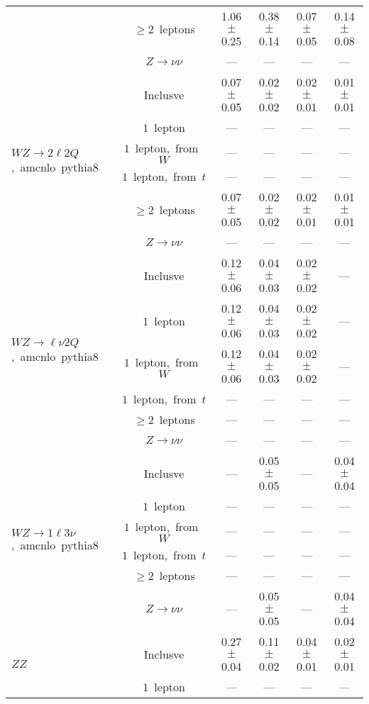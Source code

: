 \documentclass{article}
\begin{document}
\begin{longtable}{|l|c|c|c|c|c|}
 & $\ge2$~leptons  & 1.06 $\pm$ 0.25  & 0.38 $\pm$ 0.14  & 0.07 $\pm$ 0.05  & 0.14 $\pm$ 0.08 \\* 
 & $Z\rightarrow\nu\nu$  & ---  & ---  & ---  & --- \\* 
\hline 
\multirow{6}{*}{$WZ{\rightarrow}2{\ell}2Q$,~amcnlo~pythia8} & Inclusve  & 0.07 $\pm$ 0.05  & 0.02 $\pm$ 0.02  & 0.02 $\pm$ 0.01  & 0.01 $\pm$ 0.01 \\* 
 & $1$~lepton  & ---  & ---  & ---  & --- \\* 
 & $1$~lepton,~from~$W$  & ---  & ---  & ---  & --- \\* 
 & $1$~lepton,~from~$t$  & ---  & ---  & ---  & --- \\* 
 & $\ge2$~leptons  & 0.07 $\pm$ 0.05  & 0.02 $\pm$ 0.02  & 0.02 $\pm$ 0.01  & 0.01 $\pm$ 0.01 \\* 
 & $Z\rightarrow\nu\nu$  & ---  & ---  & ---  & --- \\* 
\hline 
\multirow{6}{*}{$WZ{\rightarrow}{\ell}{\nu}2Q$,~amcnlo~pythia8} & Inclusve  & 0.12 $\pm$ 0.06  & 0.04 $\pm$ 0.03  & 0.02 $\pm$ 0.02  & --- \\* 
 & $1$~lepton  & 0.12 $\pm$ 0.06  & 0.04 $\pm$ 0.03  & 0.02 $\pm$ 0.02  & --- \\* 
 & $1$~lepton,~from~$W$  & 0.12 $\pm$ 0.06  & 0.04 $\pm$ 0.03  & 0.02 $\pm$ 0.02  & --- \\* 
 & $1$~lepton,~from~$t$  & ---  & ---  & ---  & --- \\* 
 & $\ge2$~leptons  & ---  & ---  & ---  & --- \\* 
 & $Z\rightarrow\nu\nu$  & ---  & ---  & ---  & --- \\* 
\hline 
\multirow{6}{*}{$WZ{\rightarrow}1{\ell}3{\nu}$,~amcnlo~pythia8} & Inclusve  & ---  & 0.05 $\pm$ 0.05  & ---  & 0.04 $\pm$ 0.04 \\* 
 & $1$~lepton  & ---  & ---  & ---  & --- \\* 
 & $1$~lepton,~from~$W$  & ---  & ---  & ---  & --- \\* 
 & $1$~lepton,~from~$t$  & ---  & ---  & ---  & --- \\* 
 & $\ge2$~leptons  & ---  & ---  & ---  & --- \\* 
 & $Z\rightarrow\nu\nu$  & ---  & 0.05 $\pm$ 0.05  & ---  & 0.04 $\pm$ 0.04 \\* 
\hline 
\multirow{6}{*}{$ZZ$} & Inclusve  & 0.27 $\pm$ 0.04  & 0.11 $\pm$ 0.02  & 0.04 $\pm$ 0.01  & 0.02 $\pm$ 0.01 \\* 
 & $1$~lepton  & ---  & ---  & ---  & --- \\* 

\end{longtable}
\end{document}
